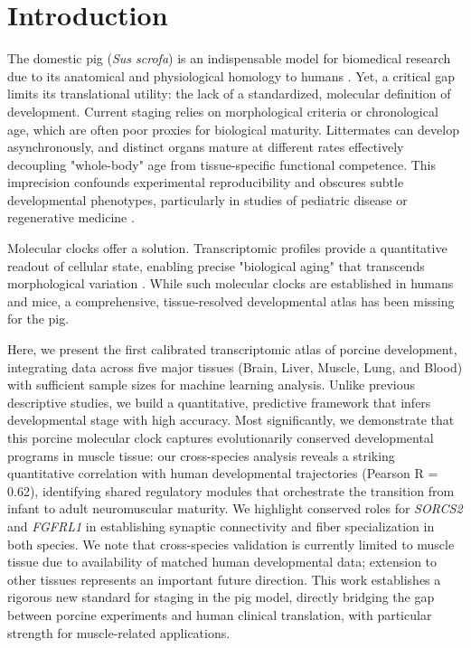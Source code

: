 \section{Introduction}

The domestic pig (\textit{Sus scrofa}) is an indispensable model for biomedical research due to its anatomical and physiological homology to humans \cite{swindle2012,lunney2021}. Yet, a critical gap limits its translational utility: the lack of a standardized, molecular definition of development. Current staging relies on morphological criteria or chronological age, which are often poor proxies for biological maturity. Littermates can develop asynchronously, and distinct organs mature at different rates effectively decoupling "whole-body" age from tissue-specific functional competence. This imprecision confounds experimental reproducibility and obscures subtle developmental phenotypes, particularly in studies of pediatric disease or regenerative medicine \cite{bendus2006,orrahilly2010}.

Molecular clocks offer a solution. Transcriptomic profiles provide a quantitative readout of cellular state, enabling precise "biological aging" that transcends morphological variation \cite{schachtschneider2021,zhengh2023}. While such molecular clocks are established in humans and mice, a comprehensive, tissue-resolved developmental atlas has been missing for the pig.

Here, we present the first calibrated transcriptomic atlas of porcine development, integrating data across five major tissues (Brain, Liver, Muscle, Lung, and Blood) with sufficient sample sizes for machine learning analysis. Unlike previous descriptive studies, we build a quantitative, predictive framework that infers developmental stage with high accuracy. Most significantly, we demonstrate that this porcine molecular clock captures evolutionarily conserved developmental programs in muscle tissue: our cross-species analysis reveals a striking quantitative correlation with human developmental trajectories (Pearson R = 0.62), identifying shared regulatory modules that orchestrate the transition from infant to adult neuromuscular maturity. We highlight conserved roles for \textit{SORCS2} and \textit{FGFRL1} in establishing synaptic connectivity and fiber specialization in both species. We note that cross-species validation is currently limited to muscle tissue due to availability of matched human developmental data; extension to other tissues represents an important future direction. This work establishes a rigorous new standard for staging in the pig model, directly bridging the gap between porcine experiments and human clinical translation, with particular strength for muscle-related applications.